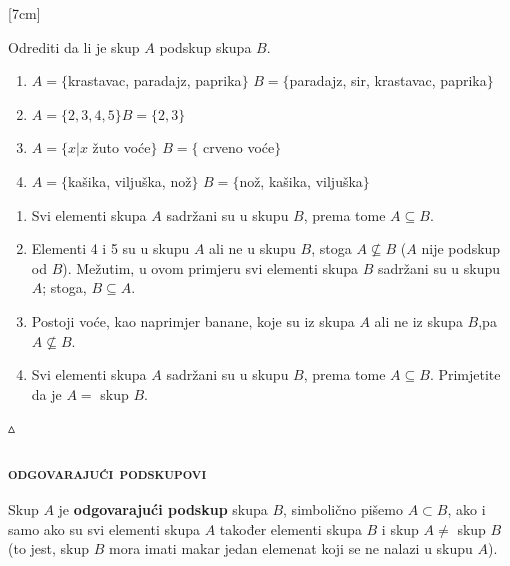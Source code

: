 \documentclass[a4paper,14pt,svgnames]{article}
\newcounter{counter}
\newcommand{\examplecounter}{\textbf{\refstepcounter{counter}PRIMJER \thecounter}}
\newcommand{\example}[3]{\begin{tcolorbox}[breakable,title=\large \examplecounter \hfill\small\textbf{"#1"},pad at break=1mm]
#2
\begin{tcolorbox}[breakable,title=\small \textbf{RJEŠENJE},colback=white,pad at break=1mm]
\begin{center}
#3

\vspace{0.5em}\hfill $\vartriangle$
\end{center}
\end{tcolorbox}
\end{tcolorbox}}
\begin{document}
\reversemarginpar
\color{white}
[7cm]
\color{black}

\example{Da li je $A$ podskup?}{Odrediti da li je skup $A$ podskup skupa $B$.
\begin{enumerate}[label=\alph*),leftmargin=0.5cm]
\item $A=\{$krastavac, paradajz, paprika$\}$
$B=\{$paradajz, sir, krastavac, paprika$\}$
\item $A=\{2, 3, 4, 5\}$\quad $B=\{2, 3\}$
\item $A=\{x|x$ žuto voće$\}$
$B=\{$ crveno voće$\}$
\item $A=\{$kašika, viljuška, nož$\}$
$B=\{$nož, kašika, viljuška$\}$
\end{enumerate}}{%
{\begin{enumerate}[label=\alph*),leftmargin=0.5cm]
\item Svi elementi skupa $A$ sadržani su u skupu $B$, prema tome $A\subseteq B$.
\item Elementi 4 i 5 su u skupu $A$ ali ne u skupu $B$, stoga $A\nsubseteq B$ ($A$ nije podskup od $B$). Mežutim, u ovom primjeru svi elementi skupa $B$ sadržani su u skupu $A$; stoga, $B\subseteq A$.
\item Postoji voće, kao naprimjer banane, koje su iz skupa $A$ ali ne iz skupa $B$,pa $A\nsubseteq B$.
\item Svi elementi skupa $A$ sadržani su u skupu $B$, prema tome $A\subseteq B$. Primjetite da je $A=$ skup $B$.
\end{enumerate}}}

\subsubsection{\textsc{odgovarajući podskupovi}}
\bigskip\bigskip
\begin{tcolorbox}
Skup $A$ je \textbf{odgovarajući podskup} skupa $B$, simbolično pišemo $A\subset B$, ako i samo ako su svi elementi skupa $A$ također elementi skupa $B$ i skup $A\neq$ skup $B$(to jest, skup $B$ mora imati makar jedan elemenat koji se ne nalazi u skupu $A$).
\end{tcolorbox}\smallskip
\end{document}
